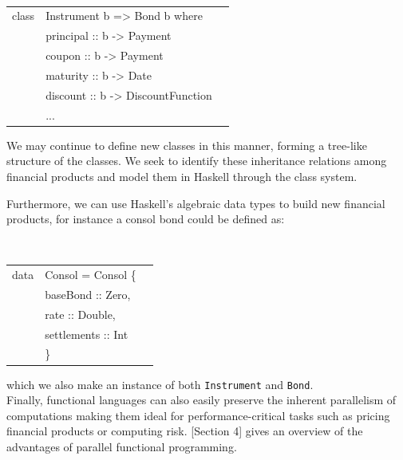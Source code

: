 \documentclass[11pt]{article}
\begin{document}
\begin{center}
\tt
\begin{tabular}{lll}
class & Instrument b => Bond b where\\
      &\hspace{-1cm} principal :: b -> Payment\\
      &\hspace{-1cm} coupon    :: b -> Payment\\
      &\hspace{-1cm} maturity  :: b -> Date\\
      &\hspace{-1cm} discount  :: b -> DiscountFunction\\
      &\hspace{-1cm} ...\\
\end{tabular}
\end{center}

We may continue to define new classes in this manner, forming a tree-like
structure of the classes. We seek to identify these inheritance relations among
financial products and model them in Haskell through the class system.

Furthermore, we can use Haskell's algebraic data types to build new financial products, for instance
a consol bond could be defined as:

\begin{center}
\tt
\begin{tabular}{lll}
data & Consol = Consol \{\\
      &\hspace{-1cm} baseBond    :: Zero,\\
      &\hspace{-1cm} rate        :: Double,\\
      &\hspace{-1cm} settlements :: Int\\
      &\hspace{-0.8cm}\}
\end{tabular}
\end{center}

which we also make an instance of both {\tt Instrument} and {\tt Bond}.\\

Finally, functional languages can also easily preserve the inherent parallelism 
of computations making them ideal for performance-critical tasks such as pricing
financial products or computing risk. \cite{hiperfit2010}[Section 4] gives an
overview of the advantages of parallel functional programming.\\
\end{document}
